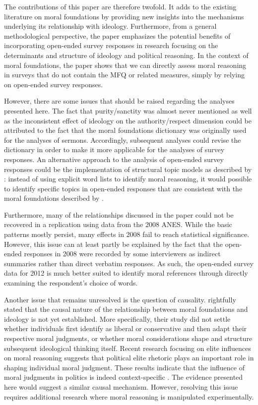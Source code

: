 \documentclass[12pt]{article}
\begin{document}
The contributions of this paper are therefore twofold. It adds to the existing literature on moral foundations by providing new insights into the mechanisms underlying its relationship with ideology. Furthermore, from a general methodological perspective, the paper emphasizes the potential benefits of incorporating open-ended survey responses in research focusing on the determinants and structure of ideology and political reasoning. In the context of moral foundations, the paper shows that we can directly assess moral reasoning in surveys that do not contain the MFQ or related measures, simply by relying on open-ended survey responses.

However, there are some issues that should be raised regarding the analyses presented here. The fact that purity/sanctity was almost never mentioned as well as the inconsistent effect of ideology on the authority/respect dimension could be attributed to the fact that the moral foundations dictionary was originally used for the analyses of sermons. Accordingly, subsequent analyses could revise the dictionary in order to make it more applicable for the analyses of survey responses. An alternative approach to the analysis of open-ended survey responses could be the implementation of structural topic models as described by \citet{roberts2014structural}: instead of using explicit word lists to identify moral reasoning, it would possible to identify specific topics in open-ended responses that are consistent with the moral foundations described by \citet{haidt2008moral} \citep[see also][]{lin2008joint}.

Furthermore, many of the relationships discussed in the paper could not be recovered in a replication using data from the 2008 ANES. While the basic patterns mostly persist, many effects in 2008 fail to reach statistical significance. However, this issue can at least partly be explained by the fact that the open-ended responses in 2008 were recorded by some interviewers as indirect summaries rather than direct verbatim responses. As such, the open-ended survey data for 2012 is much better suited to identify moral references through directly examining the respondent's choice of words.

Another issue that remains unresolved is the question of causality. \citet{graham2009liberals} rightfully stated that the causal nature of the relationship between moral foundations and ideology is not yet established. More specifically, their study did not settle whether individuals first identify as liberal or conservative and then adapt their respective moral judgments, or whether moral considerations shape and structure subsequent ideological thinking itself. Recent research focusing on elite influences on moral reasoning suggests that political elite rhetoric plays an important role in shaping individual moral judgment. These results indicate that the influence of moral judgments in politics is indeed context-specific \citep[see for example][]{clifford2013words,clifford2015concerns}. The evidence presented here would suggest a similar causal mechanism. However, resolving this issue requires additional research where moral reasoning is manipulated experimentally.
\end{document}
